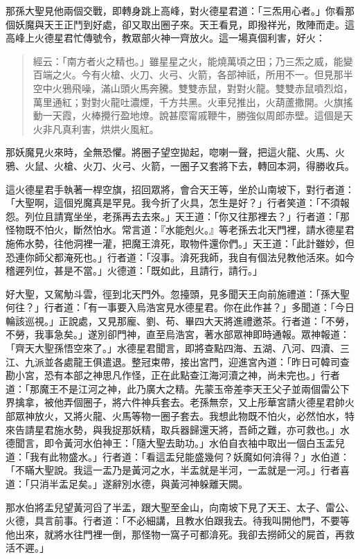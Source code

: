那孫大聖見他兩個交戰，即轉身跳上高峰，對火德星君道：「三炁用心者。」你看那個妖魔與天王正鬥到好處，卻又取出圈子來。天王看見，即撥祥光，敗陣而走。這高峰上火德星君忙傳號令，教眾部火神一齊放火。這一場真個利害，好火：
\begin{quote}
經云：「南方者火之精也。」雖星星之火，能燒萬頃之田；乃三炁之威，能變百端之火。今有火槍、火刀、火弓、火箭，各部神祇，所用不一。但見那半空中火鴉飛噪，滿山頭火馬奔騰。雙雙赤鼠，對對火龍。雙雙赤鼠噴烈焰，萬里通紅；對對火龍吐濃煙，千方共黑。火車兒推出，火葫蘆撒開。火旗搖動一天霞，火棒攪行盈地燎。說甚麼甯戚鞭牛，勝強似周郎赤壁。這個是天火非凡真利害，烘烘火風紅。
\end{quote}

那妖魔見火來時，全無恐懼。將圈子望空拋起，唿喇一聲，把這火龍、火馬、火鴉、火鼠、火槍、火刀、火弓、火箭，一圈子又套將下去，轉回本洞，得勝收兵。

這火德星君手執著一桿空旗，招回眾將，會合天王等，坐於山南坡下，對行者道：「大聖啊，這個兇魔真是罕見。我今折了火具，怎生是好？」行者笑道：「不須報怨。列位且請寬坐坐，老孫再去去來。」天王道：「你又往那裡去？」行者道：「那怪物既不怕火，斷然怕水。常言道：『水能剋火。』等老孫去北天門裡，請水德星君施佈水勢，往他洞裡一灌，把魔王渰死，取物件還你們。」天王道：「此計雖妙，但恐連你師父都淹死也。」行者道：「沒事。渰死我師，我自有個法兒教他活來。如今稽遲列位，甚是不當。」火德道：「既如此，且請行，請行。」

好大聖，又駕觔斗雲，徑到北天門外。忽擡頭，見多聞天王向前施禮道：「孫大聖何往？」行者道：「有一事要入烏浩宮見水德星君。你在此作甚？」多聞道：「今日輪該巡視。」正說處，又見那龐、劉、苟、畢四大天將進禮邀茶。行者道：「不勞，不勞，我事急矣。」遂別卻門神，直至烏浩宮，著水部眾神即時通報。眾神報道：「齊天大聖孫悟空來了。」水德星君聞言，即將查點四海、五湖、八河、四瀆、三江、九派並各處龍王俱遣退。整冠束帶，接出宮門，迎進宮內道：「昨日可韓司查勘小宮，恐有本部之神思凡作怪，正在此點查江海河瀆之神，尚未完也。」行者道：「那魔王不是江河之神，此乃廣大之精。先蒙玉帝差李天王父子並兩個雷公下界擒拿，被他弄個圈子，將六件神兵套去。老孫無奈，又上彤華宮請火德星君帥火部眾神放火，又將火龍、火馬等物一圈子套去。我想此物既不怕火，必然怕水，特來告請星君施水勢，與我捉那妖精，取兵器歸還天將，吾師之難，亦可救也。」水德聞言，即令黃河水伯神王：「隨大聖去助功。」水伯自衣袖中取出一個白玉盂兒道：「我有此物盛水。」行者道：「看這盂兒能盛幾何？妖魔如何渰得？」水伯道：「不瞞大聖說。我這一盂乃是黃河之水，半盂就是半河，一盂就是一河。」行者喜道：「只消半盂足矣。」遂辭別水德，與黃河神躲離天闕。

那水伯將盂兒望黃河舀了半盂，跟大聖至金山，向南坡下見了天王、太子、雷公、火德，具言前事。行者道：「不必細講，且教水伯跟我去。待我叫開他門，不要等他出來，就將水往門裡一倒，那怪物一窩子可都渰死。我卻去撈師父的屍首，再救活不遲。」

